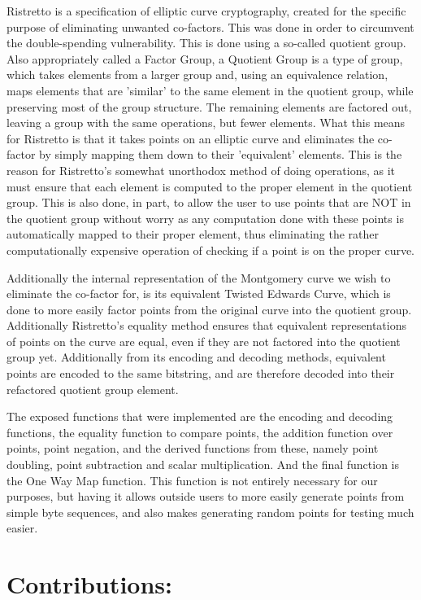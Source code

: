 \documentclass{article}
\begin{document}
Ristretto is a specification of elliptic curve cryptography, created for
the specific purpose of eliminating unwanted co-factors. This was done
in order to circumvent the double-spending vulnerability. This is done
using a so-called quotient group. Also appropriately called a Factor
Group, a Quotient Group is a type of group, which takes elements from a
larger group and, using an equivalence relation, maps elements that are
'similar' to the same element in the quotient group, while preserving
most of the group structure. The remaining elements are factored out,
leaving a group with the same operations, but fewer elements. What
this means for Ristretto is that it takes points on an elliptic curve
and eliminates the co-factor by simply mapping them down to their
'equivalent' elements. This is the reason for Ristretto's somewhat
unorthodox method of doing operations, as it must ensure that each
element is computed to the proper element in the quotient group. This is
also done, in part, to allow the user to use points that are NOT in the
quotient group without worry as any computation done with these points
is automatically mapped to their proper element, thus eliminating the
rather computationally expensive operation of checking if a point is
on the proper curve.

Additionally the internal representation of the Montgomery curve we wish
to eliminate the co-factor for, is its equivalent Twisted Edwards Curve,
which is done to more easily factor points from the original curve into
the quotient group. Additionally Ristretto's equality method ensures
that equivalent representations of points on the curve are equal, even
if they are not factored into the quotient group yet. Additionally
from its encoding and decoding methods, equivalent points are encoded
to the same bitstring, and are therefore decoded into their refactored
quotient group element.

The exposed functions that were implemented are the encoding and decoding
functions, the equality function to compare points, the addition function
over points, point negation, and the derived functions from these,
namely point doubling, point subtraction and scalar multiplication. And
the final function is the One Way Map function. This function is not
entirely necessary for our purposes, but having it allows outside users
to more easily generate points from simple byte sequences, and 
also makes generating random points for testing much easier.

\section{Contributions:}
\end{document}
